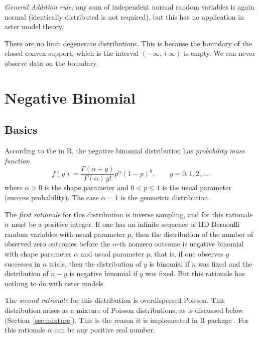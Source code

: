 \emph{General Addition rule:} any sum of independent
normal random variables is again normal
(identically distributed is not required), but this has no application
in aster model theory.

There are no limit degenerate distributions.
This is because the boundary of the closed convex support,
which is the interval $(- \infty, + \infty)$ is empty.
We can never observe data on the boundary.

\section{Negative Binomial}
\label{sec:negative-binomial}

\subsection{Basics}
\label{sec:negative-binomial-basics}

According to the  in R, the negative binomial
distribution has \emph{probability mass function}
\begin{equation} \label{eq:negative-binomial-pmf}
   f(y) = \frac{\Gamma(\alpha + y)}{\Gamma(\alpha) \, y!} p^\alpha (1-p)^y,
   \qquad y = 0, 1, 2, \ldots.
\end{equation}
where $\alpha > 0$ is the shape parameter and $0 < p \le 1$ is the
usual parameter (success probability).  The case $\alpha = 1$ is the
geometric distribution.

The \emph{first rationale} for this distribution is inverse sampling,
and for this rationale $\alpha$ must be a positive integer.
If one has an infinite
sequence of IID Bernoulli random variables with usual parameter $p$,
then the distribution of the number of observed zero outcomes before the
$\alpha$-th nonzero outcome is negative binomial with shape parameter $\alpha$
and usual parameter $p$, that is, if one observes $y$ successes in $n$ trials,
then the distribution of $y$ is binomial if $n$ was fixed and the distribution
of $n - y$ is negative binomial if $y$ was fixed.
But this rationale has nothing to do with aster models.

The \emph{second rationale} for this distribution is overdispersed Poisson.
This distribution arises as a mixture of Poisson distributions,
as is discussed below (Section~\ref{sec:mixture}).
This is the reason it is implemented in R package
.  For this rationale $\alpha$ can be any positive real number.

